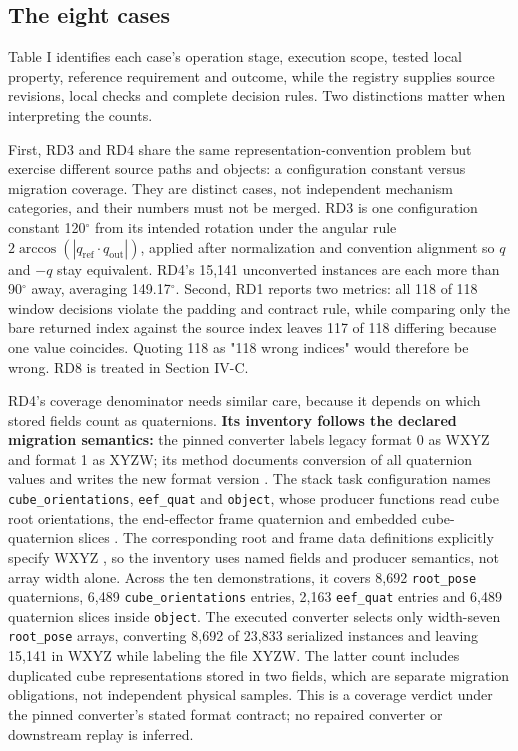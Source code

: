 \documentclass[conference]{IEEEtran}
\begin{document}
\subsection{The eight cases}



Table I identifies each case's operation stage, execution scope, tested local property, reference requirement and outcome, while the registry supplies source revisions, local checks and complete decision rules. Two distinctions matter when interpreting the counts.\par

First, RD3 and RD4 share the same representation-convention problem but exercise different source paths and objects: a configuration constant versus migration coverage. They are distinct cases, not independent mechanism categories, and their numbers must not be merged. RD3 is one configuration constant 120\(^{\circ}\) from its intended rotation under the angular rule \(2\arccos(|q_{\mathrm{ref}}\cdot q_{\mathrm{out}}|)\), applied after normalization and convention alignment so \(q\) and \(-q\) stay equivalent. RD4's 15,141 unconverted instances are each more than 90\(^{\circ}\) away, averaging 149.17\(^{\circ}\). Second, RD1 reports two metrics: all 118 of 118 window decisions violate the padding and contract rule, while comparing only the bare returned index against the source index leaves 117 of 118 differing because one value coincides. Quoting 118 as "118 wrong indices" would therefore be wrong. RD8 is treated in Section IV-C.\par

RD4's coverage denominator needs similar care, because it depends on which stored fields count as quaternions. \textbf{Its inventory follows the declared migration semantics:} the pinned converter labels legacy format 0 as WXYZ and format 1 as XYZW; its method documents conversion of all quaternion values and writes the new format version \cite{3}. The stack task configuration names \texttt{cube\_\allowbreak{}\allowbreak{}orientations}, \texttt{eef\_\allowbreak{}\allowbreak{}quat} and \texttt{object}, whose producer functions read cube root orientations, the end-effector frame quaternion and embedded cube-quaternion slices \cite{32}. The corresponding root and frame data definitions explicitly specify WXYZ \cite{33}, so the inventory uses named fields and producer semantics, not array width alone. Across the ten demonstrations, it covers 8,692 \texttt{root\_\allowbreak{}\allowbreak{}pose} quaternions, 6,489 \texttt{cube\_\allowbreak{}\allowbreak{}orientations} entries, 2,163 \texttt{eef\_\allowbreak{}\allowbreak{}quat} entries and 6,489 quaternion slices inside \texttt{object}. The executed converter selects only width-seven \texttt{root\_\allowbreak{}\allowbreak{}pose} arrays, converting 8,692 of 23,833 serialized instances and leaving 15,141 in WXYZ while labeling the file XYZW. The latter count includes duplicated cube representations stored in two fields, which are separate migration obligations, not independent physical samples. This is a coverage verdict under the pinned converter's stated format contract; no repaired converter or downstream replay is inferred.\par
\end{document}
